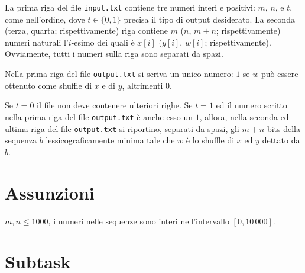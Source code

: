 La prima riga del file \verb'input.txt' contiene tre numeri interi e positivi: $m$, $n$, e $t$, come nell’ordine, dove $t\in \{0,1\}$ precisa il tipo di output desiderato.
La seconda (terza, quarta; rispettivamente) riga contiene $m$ ($n$, $m+n$; rispettivamente) numeri naturali l'$i$-esimo dei quali è $x[i]$ ($y[i]$, $w[i]$; rispettivamente).
Ovviamente, tutti i numeri sulla riga sono separati da spazi.

Nella prima riga del file \verb'output.txt' si scriva un unico numero:
$1$ se $w$ può essere ottenuto come shuffle di $x$ e di $y$, altrimenti $0$.

Se $t=0$ il file non deve contenere ulteriori righe.
Se $t=1$ ed il numero scritto nella prima riga del file \verb'output.txt'
è anche esso un $1$, allora, nella seconda ed ultima riga del file \verb'output.txt' si riportino, separati da spazi, gli $m+n$ bits della sequenza $b$
lessicograficamente minima tale che
$w$ è lo shuffle di $x$ ed $y$ dettato da $b$.\\





\section*{Assunzioni}

$m,n \leq 1000$, i numeri nelle sequenze sono interi nell'intervallo $[0,10\,000]$.

\section*{Subtask}

